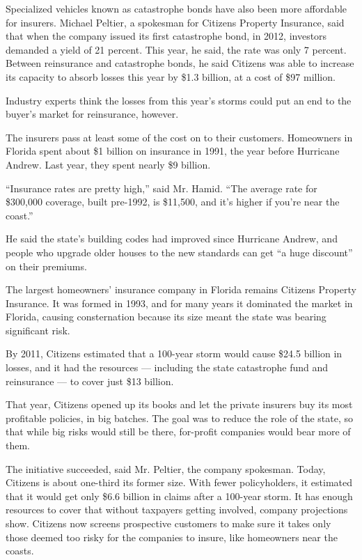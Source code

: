 Specialized vehicles known as catastrophe bonds have also been more
affordable for insurers. Michael Peltier, a spokesman for Citizens
Property Insurance, said that when the company issued its first
catastrophe bond, in 2012, investors demanded a yield of 21 percent.
This year, he said, the rate was only 7 percent. Between reinsurance and
catastrophe bonds, he said Citizens was able to increase its capacity to
absorb losses this year by \$1.3 billion, at a cost of \$97 million.

Industry experts think the losses from this year's storms could put an
end to the buyer's market for reinsurance, however.

The insurers pass at least some of the cost on to their customers.
Homeowners in Florida spent about \$1 billion on insurance in 1991, the
year before Hurricane Andrew. Last year, they spent nearly \$9 billion.

``Insurance rates are pretty high,'' said Mr. Hamid. ``The average rate
for \$300,000 coverage, built pre-1992, is \$11,500, and it's higher if
you're near the coast.''

He said the state's building codes had improved since Hurricane Andrew,
and people who upgrade older houses to the new standards can get ``a
huge discount'' on their premiums.

The largest homeowners' insurance company in Florida remains Citizens
Property Insurance. It was formed in 1993, and for many years it
dominated the market in Florida, causing consternation because its size
meant the state was bearing significant risk.

By 2011, Citizens estimated that a 100-year storm would cause \$24.5
billion in losses, and it had the resources --- including the state
catastrophe fund and reinsurance --- to cover just \$13 billion.

That year, Citizens opened up its books and let the private insurers buy
its most profitable policies, in big batches. The goal was to reduce the
role of the state, so that while big risks would still be there,
for-profit companies would bear more of them.

The initiative succeeded, said Mr. Peltier, the company spokesman.
Today, Citizens is about one-third its former size. With fewer
policyholders, it estimated that it would get only \$6.6 billion in
claims after a 100-year storm. It has enough resources to cover that
without taxpayers getting involved, company projections show. Citizens
now screens prospective customers to make sure it takes only those
deemed too risky for the companies to insure, like homeowners near the
coasts.


